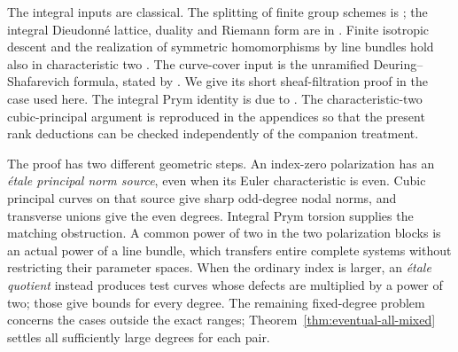\documentclass[11pt]{article}
\theoremstyle{definition}\newtheorem{definition}[theorem]{Definition}
\theoremstyle{remark}\newtheorem{remark}[theorem]{Remark}
\begin{document}
The integral inputs are classical. The splitting of finite group schemes is \citet[Lemma~4.44 and Proposition~4.45, p.~67]{EGM}; the integral Dieudonn\'e lattice, duality and Riemann form are in \citet[Theorem~3.14 and Corollaries~3.15--3.16, pp.~87--88; Propositions~3.18, 3.22 and 3.24, pp.~89, 99--101]{Oda1969}. Finite isotropic descent and the realization of symmetric homomorphisms by line bundles hold also in characteristic two \citep[Corollary~8.11, p.~117; Proposition~11.2 and Corollary~11.3, pp.~159--160]{EGM}. The curve-cover input is the unramified Deuring--Shafarevich formula, stated by \citet[equation~(1.8.2), p.~36]{Crew}. We give its short sheaf-filtration proof in the case used here. The integral Prym identity is due to \citet[\S3, equations~(3.2)--(3.3), pp.~346--347]{Debarre}. The characteristic-two cubic-principal argument is reproduced in the appendices so that the present rank deductions can be checked independently of the companion treatment.

The proof has two different geometric steps. An index-zero polarization has an \emph{\'etale principal norm source}, even when its Euler characteristic is even. Cubic principal curves on that source give sharp odd-degree nodal norms, and transverse unions give the even degrees. Integral Prym torsion supplies the matching obstruction. A common power of two in the two polarization blocks is an actual power of a line bundle, which transfers entire complete systems without restricting their parameter spaces. When the ordinary index is larger, an \emph{\'etale quotient} instead produces test curves whose defects are multiplied by a power of two; those give bounds for every degree. The remaining fixed-degree problem concerns the cases outside the exact ranges; Theorem~\ref{thm:eventual-all-mixed} settles all sufficiently large degrees for each pair.
\end{document}
